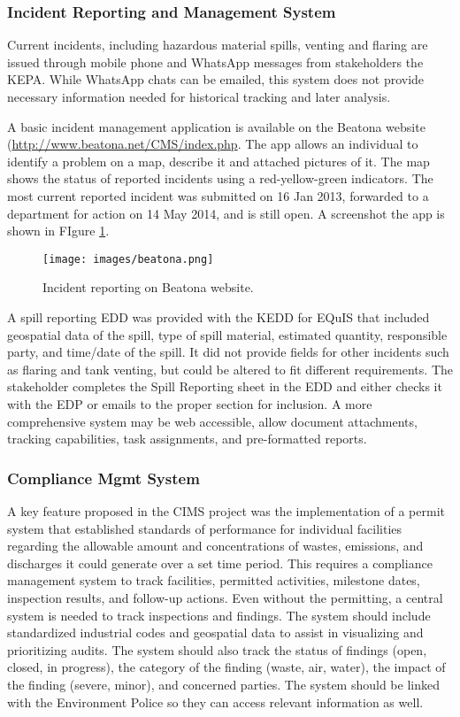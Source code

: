 \subsubsection{Incident Reporting and Management System}
Current incidents, including hazardous material spills, venting and flaring are issued through mobile phone and WhatsApp messages from stakeholders the KEPA. While WhatsApp chats can be emailed, this system does not provide necessary information needed for historical tracking and later analysis. 

A basic incident management application is available on the Beatona website (\url{http://www.beatona.net/CMS/index.php}. The app allows an individual to identify a problem on a map, describe it and attached pictures of it. The map shows the status of reported incidents using a red-yellow-green indicators. The most current reported incident was submitted on 16 Jan 2013, forwarded to a department for action on 14 May 2014, and is still open. A screenshot the app is shown in FIgure \ref{fig:beatonat}.

%
\begin{figure}[!htpb]
\centering
\texttt{[image: images/beatona.png]} 
\caption{Incident reporting on Beatona website.}
\label{fig:beatonat}
\end{figure}
%

A spill reporting EDD was provided with the KEDD for EQuIS that included geospatial data of the spill, type of spill material, estimated quantity, responsible party, and time/date of the spill. It did not provide fields for other incidents such as flaring and tank venting, but could be altered to fit different requirements. The stakeholder completes the Spill Reporting sheet in the EDD and either checks it with the EDP or emails to the proper section for inclusion. A more comprehensive system may be web accessible, allow document attachments, tracking capabilities, task assignments, and pre-formatted reports.

\subsubsection{Compliance Mgmt System}
A key feature proposed in the CIMS project was the implementation of a permit system that established standards of performance for individual facilities regarding the allowable amount and concentrations of wastes, emissions, and discharges it could generate over a set time period. This requires a compliance management system to track facilities, permitted activities, milestone dates, inspection results, and follow-up actions. Even without the permitting, a central system is needed to track inspections and findings. The system should include standardized industrial codes and geospatial data to assist in visualizing and prioritizing audits. The system should also track the status of findings (open, closed, in progress), the category of the finding (waste, air, water), the impact of the finding (severe, minor), and concerned parties. The system should be linked with the Environment Police so they can access relevant information as well.

